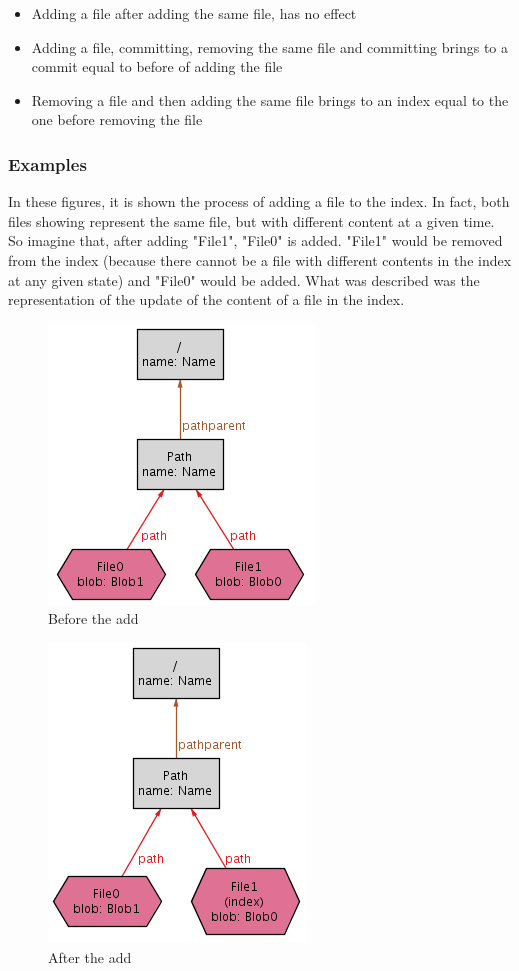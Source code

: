 \begin{itemize}
	\item Adding a file after adding the same file, has no effect
	\item Adding a file, committing, removing the same file and 
	committing brings to a commit equal to before of adding the file
	\item Removing a file and then adding the same file brings to an
	index equal to the one before removing the file
\end{itemize}

\subsubsection{Examples}

In these figures, it is shown the process of adding a file to the index. In
fact, both files showing represent the same file, but with different content at
a given time. So imagine that, after adding "File1", "File0" is added. "File1"
would be removed from the index (because there cannot be a file with different
contents in the index at any given state) and "File0" would be added. What was
described was the representation of the update of the content of a file in the
index. \par 
\begin{figure}[h!] 
	\caption{Before the add}
	\centering
	\includegraphics[scale=0.65]{images/add1.png}
\end{figure}

\begin{figure}[h!] 
	\caption{After the add}
	\centering
	\includegraphics[scale=0.65]{images/add2.png}
\end{figure}


